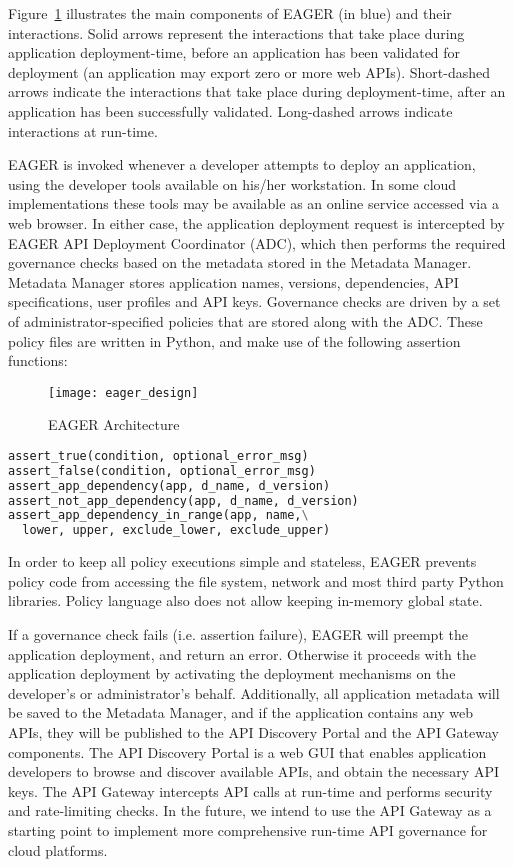 Figure~\ref{fig:eager_design} illustrates the main components of EAGER (in
blue) and their interactions. Solid arrows represent the interactions that take place
during application deployment-time, before an application has been validated
for deployment (an application may export zero or more web APIs). 
Short-dashed arrows indicate the interactions that take place
during deployment-time, after an application has been successfully validated.
Long-dashed arrows indicate interactions at run-time.

EAGER is invoked whenever a developer attempts to deploy an application, using
the developer tools available on his/her workstation. In some cloud
implementations these tools may be available as an online service accessed
via a web browser. In either case, the application deployment request is
intercepted by EAGER API Deployment Coordinator (ADC), which then performs the 
required governance checks based on the metadata stored in the Metadata Manager.
Metadata Manager stores application names, versions, dependencies, API specifications,
user profiles and API keys.
Governance checks are driven by a set of administrator-specified policies that
are stored along with the ADC. These policy files are written in Python, and make use of 
the following assertion functions:

\begin{figure}
\centering
\texttt{[image: eager\_design]}
\caption{EAGER Architecture}
\label{fig:eager_design}
\end{figure}

{\footnotesize 
\begin{lstlisting}[language=Python, frame=single]
assert_true(condition, optional_error_msg)
assert_false(condition, optional_error_msg)
assert_app_dependency(app, d_name, d_version)
assert_not_app_dependency(app, d_name, d_version)
assert_app_dependency_in_range(app, name,\
  lower, upper, exclude_lower, exclude_upper)
\end{lstlisting}
}

In order to keep all policy executions simple and stateless, EAGER prevents
policy code from accessing the file system, network and most third party Python
libraries. Policy language also does not allow keeping in-memory global state.

If a governance check fails (i.e. assertion failure), EAGER will preempt the 
application deployment, and
return an error. Otherwise it proceeds with the application deployment by
activating the deployment mechanisms on the developer's or administrator's
behalf. Additionally, all application metadata will be saved to the Metadata Manager, and
if the application contains any web APIs, they will be published to the API Discovery Portal
and the API Gateway components. The API Discovery Portal is a web GUI that enables 
application developers to browse and
discover available APIs, and obtain the necessary API keys. The API Gateway intercepts
API calls at run-time and performs security and rate-limiting checks. In the future, we intend
to use the API Gateway as a starting point to implement more comprehensive run-time
API governance for cloud platforms.

